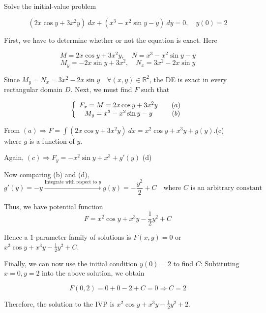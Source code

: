 \begin{example}
    Solve the initial-value problem

    \[
        (2x\cos y + 3x^2 y)\> dx + (x^3 - x^2 \sin y - y)\> dy = 0, \quad y(0) = 2
    \]
\end{example}
\begin{solution}
    First, we have to determine whether or not the equation is exact. Here 

    \[
        M = 2x\cos y + 3x^2y, \quad N = x^3 - x^2\sin y - y
    \]
    \[
        M_y = -2x\sin y + 3x^2, \quad N_x = 3x^2 - 2x\sin y
    \]

    Since $M_y = N_x = 3x^2 - 2x\sin y \quad \forall (x, y) \in \mathbb{R}^2$, the DE is exact in every rectangular
    domain $D$. Next, we must find $F$ such that

    \[
        \left\{
        \begin{array}{cc}
         F_x = M = 2x\cos y + 3x^2y & \quad \refstepcounter{equation}(a)\\
         M_y = x^3 - x^2\sin y - y & \quad \refstepcounter{equation}(b)
        \end{array}
        \right.
        \]
    
        From $(a) \Rightarrow F = \int (2x\cos y + 3x^2y)\> dx = x^2\cos y + x^3y + g(y)$.\quad (c)\\
        where $g$ is a function of $y$.

        Again, $(c) \Rightarrow F_y = -x^2\sin y + x^3 + g'(y)$ \quad (d)

        Now comparing (b) and (d), 
        \[
            g'(y) = -y \xrightarrow[]{\text{Integrate with respect to } y} g(y) = -\frac{y^2}{2} + C \quad 
            \text{where } C \text{ is an arbitrary constant}
        \]

        Thus, we have potential function 
        \[
            F = x^2\cos y + x^3y - \frac{1}{2}y^2 + C
        \]

        Hence a 1-parameter family of solutions is $F(x,y) = 0$ or 
        $\displaystyle x^2\cos y + x^3y - \frac{1}{2}y^2 + C$.

        Finally, we can now use the initial condition $y(0) = 2$ to find $C$: Subtituting 
        $x = 0, y = 2$ into the above solution, we obtain

        \[
            F(0, 2) = 0 + 0 - 2 + C = 0 \Rightarrow C = 2
        \]

        Therefore, the solution to the IVP is $\displaystyle x^2\cos y + x^3y - \frac{1}{2}y^2 + 2$.
\end{solution}

